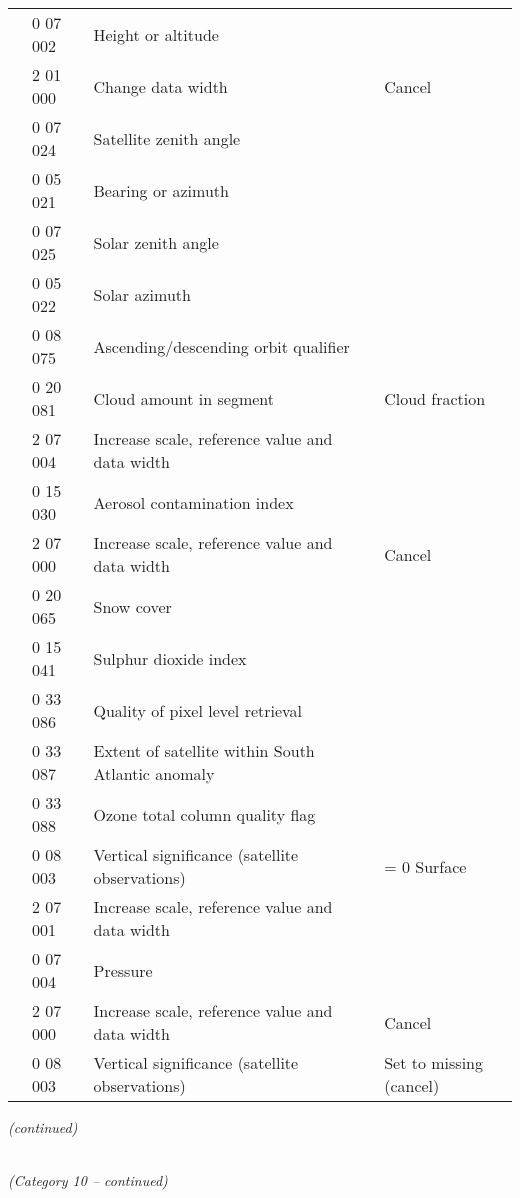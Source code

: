 \begin{longtable}[]{@{}llll@{}}
& 0 07 002 & Height or altitude &\tabularnewline
& 2 01 000 & Change data width & Cancel\tabularnewline
& 0 07 024 & Satellite zenith angle &\tabularnewline
& 0 05 021 & Bearing or azimuth &\tabularnewline
& 0 07 025 & Solar zenith angle &\tabularnewline
& 0 05 022 & Solar azimuth &\tabularnewline
& 0 08 075 & Ascending/descending orbit qualifier &\tabularnewline
& 0 20 081 & Cloud amount in segment & Cloud fraction\tabularnewline
& 2 07 004 & Increase scale, reference value and data width &\tabularnewline
& 0 15 030 & Aerosol contamination index &\tabularnewline
& 2 07 000 & Increase scale, reference value and data width & Cancel\tabularnewline
& 0 20 065 & Snow cover &\tabularnewline
& 0 15 041 & Sulphur dioxide index &\tabularnewline
& 0 33 086 & Quality of pixel level retrieval &\tabularnewline
& 0 33 087 & Extent of satellite within South Atlantic anomaly &\tabularnewline
& 0 33 088 & Ozone total column quality flag &\tabularnewline
& 0 08 003 & Vertical significance (satellite observations) & = 0 Surface\tabularnewline
& 2 07 001 & Increase scale, reference value and data width &\tabularnewline
& 0 07 004 & Pressure &\tabularnewline
& 2 07 000 & Increase scale, reference value and data width & Cancel\tabularnewline
& 0 08 003 & Vertical significance (satellite observations) & Set to missing (cancel)\tabularnewline
\bottomrule
\end{longtable}

\emph{(continued)}

\emph{\\
(Category 10 -- continued)}

